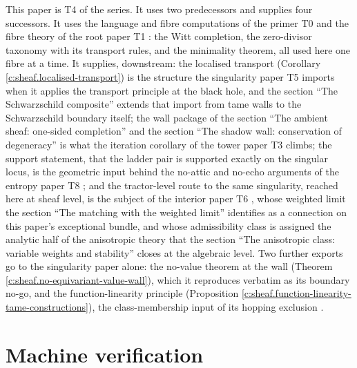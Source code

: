 \documentclass[11pt]{article}
\theoremstyle{definition}
\theoremstyle{plain}
\begin{document}
\label{c:note.sheaf.setting-position-series}
This paper is T4 of the series. It uses two predecessors and supplies four successors. It uses the language and fibre computations of the primer T0 \cite{ButlerT0} and the fibre theory of the root paper T1 \cite{ButlerT1}: the Witt completion, the zero-divisor taxonomy with its transport rules, and the minimality theorem, all used here one fibre at a time. It supplies, downstream: the localised transport (Corollary \ref{c:sheaf.localised-transport}) is the structure the singularity paper T5 \cite{ButlerT5} imports when it applies the transport principle at the black hole, and the section ``The Schwarzschild composite'' extends that import from tame walls to the Schwarzschild boundary itself; the wall package of the section ``The ambient sheaf: one-sided completion'' and the section ``The shadow wall: conservation of degeneracy'' is what the iteration corollary of the tower paper T3 \cite{ButlerT3} climbs; the support statement, that the ladder pair is supported exactly on the singular locus, is the geometric input behind the no-attic and no-echo arguments of the entropy paper T8 \cite{ButlerT8}; and the tractor-level route to the same singularity, reached here at sheaf level, is the subject of the interior paper T6 \cite{ButlerT6}, whose weighted limit the section ``The matching with the weighted limit'' identifies as a connection on this paper's exceptional bundle, and whose admissibility class is assigned the analytic half of the anisotropic theory that the section ``The anisotropic class: variable weights and stability'' closes at the algebraic level. Two further exports go to the singularity paper alone: the no-value theorem at the wall (Theorem \ref{c:sheaf.no-equivariant-value-wall}), which it reproduces verbatim as its boundary no-go, and the function-linearity principle (Proposition \ref{c:sheaf.function-linearity-tame-constructions}), the class-membership input of its hopping exclusion \cite[Facts B.3, B.4]{ButlerT5}.

\section{Machine verification}
\end{document}
